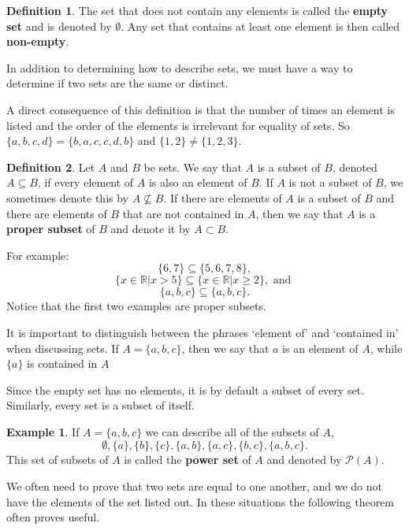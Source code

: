 \documentclass[
]{book}
\theoremstyle{definition}
\newtheorem{definition}{Definition}[chapter]
\theoremstyle{definition}
\newtheorem{example}{Example}[chapter]
\theoremstyle{definition}
\theoremstyle{definition}
\theoremstyle{remark}
\begin{document}
\begin{definition}
The set that does not contain any elements is called the \textbf{empty set} and is denoted by \(\emptyset\). Any set that contains at least one element is then called \textbf{non-empty}.
\end{definition}

In addition to determining how to describe sets, we must have a way to determine if two sets are the same or distinct.

A direct consequence of this definition is that the number of times an element is listed and the order of the elements is irrelevant for equality of sets. So \(\{a, b, c, d\}=\{b, a, c, c, d, b\}\) and \(\{1, 2\} \neq \{1, 2, 3\}\).

\begin{definition}
\protect\hypertarget{def:subset}{}\label{def:subset}Let \(A\) and \(B\) be sets. We say that \(A\) is a subset of \(B\), denoted \(A \subseteq B\), if every element of \(A\) is also an element of \(B\). If \(A\) is not a subset of \(B\), we sometimes denote this by \(A\nsubseteq B\). If there are elements of \(A\) is a subset of \(B\) and there are elements of \(B\) that are not contained in \(A\), then we say that \(A\) is a \textbf{proper subset} of \(B\) and denote it by \(A\subset B\).
\end{definition}

For example:
\[\{6, 7 \} \subseteq \{5, 6, 7, 8\},\]
\[\{x\in \mathbb{R} \vert x>5\} \subseteq \{x\in \mathbb{R} \vert x \geq 2\}, \mbox{ and }\]
\[\{a,b,c\} \subseteq \{a,b,c\}.\]
Notice that the first two examples are proper subsets.

It is important to distinguish between the phrases `element of' and `contained in' when discussing sets. If \(A= \{a,b,c\}\), then we say that \(a\) is an element of \(A\), while \(\{a\}\) is contained in \(A\)

Since the empty set has no elements, it is by default a subset of every set. Similarly, every set is a subset of itself.

\begin{example}
If \(A=\{a,b,c\}\) we can describe all of the subsets of \(A\),
\[\emptyset, \{a\}, \{b\}, \{c\}, \{a,b\}, \{a,c\}, \{b,c\}, \{a, b, c\}.\]
This set of subsets of \(A\) is called the \textbf{power set} of \(A\) and denoted by \(\mathcal{P}(A)\).
\end{example}

We often need to prove that two sets are equal to one another, and we do not have the elements of the set listed out. In these situations the following theorem often proves useful.
\end{document}
